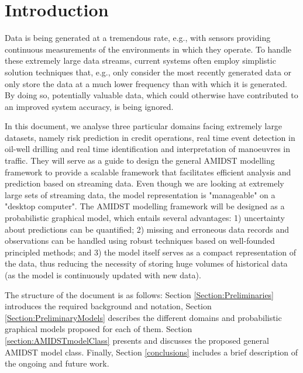 \section{Introduction}

Data is being generated at a tremendous rate, e.g., with sensors providing continuous measurements of the environments in which they operate. To handle these extremely large data streams, current systems often employ simplistic solution techniques that, e.g., only consider the most recently generated data or only store the data at a much lower frequency than with which it is generated. By doing so, potentially valuable data, which could otherwise have contributed to an improved system accuracy, is being ignored. 

In this document, we analyse three particular domains facing extremely large datasets, namely risk prediction in credit operations, real time event detection in oil-well drilling and real time identification and interpretation of manoeuvres in traffic. They will serve as a guide to design the general AMIDST modelling framework to provide a scalable framework that facilitates efficient analysis and prediction based on streaming data. Even though we are looking at extremely large sets of streaming data, the model representation is "manageable" on a "desktop computer". The AMIDST modelling framework will be designed as a probabilistic graphical model, which entails several advantages: 1) uncertainty about predictions can be quantified; 2) missing and erroneous data records and observations can be handled using robust techniques based on well-founded principled methods; and 3) the model itself serves as a compact representation of the data, thus reducing the necessity of storing huge volumes of historical data (as the model is continuously updated with new data).

The structure of the document is as follows: Section \ref{Section:Preliminaries} introduces the required background and notation, Section \ref{Section:PreliminaryModels} describes the different domains and probabilistic graphical models proposed for each of them. Section \ref{section:AMIDSTmodelClass} presents and discusses the proposed general AMIDST model class. Finally, Section \ref{conclusions} includes a brief description of the ongoing and future work.